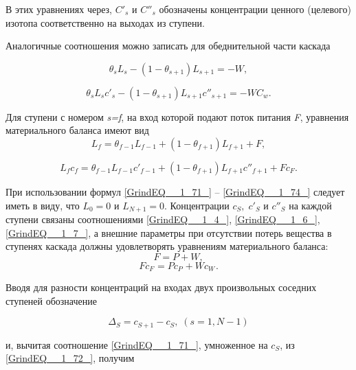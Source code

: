 В этих уравнениях через, $C'_{s}$ и $C''_{s}$ обозначены концентрации ценного (целевого) изотопа соответственно на выходах из ступени.

Аналогичные соотношения можно записать для обеднительной части каскада

\begin{equation} \label{GrindEQ__1_73_} 
  \theta _{s} L_{s} -(1-\theta _{s+1} )L_{s+1} =-W, 
\end{equation}

\begin{equation} \label{GrindEQ__1_74_} 
  \theta _{s} L_{s} c'_{s} -(1-\theta _{s+1})L_{s+1} c''_{s+1} =-WC_{w}. 
\end{equation} 

Для ступени с номером \textit{s=f}, на вход которой подают поток питания \textit{F}, уравнения материального баланса имеют вид
\begin{equation} \label{GrindEQ__1_75_} 
L_{f} =\theta _{f-1} L_{f-1} +(1-\theta _{f+1} )L_{f+1} +F,     
\end{equation}

\begin{equation} \label{GrindEQ__1_76_}
  L_{f} c_{f} = \theta _{f-1} L_{f-1} c'_{f-1} + (1-\theta _{f+1})L_{f+1} c''_{f+1} +Fc_{F}.  
\end{equation}

При использовании формул \ref{GrindEQ__1_71_} -- \ref{GrindEQ__1_74_} следует иметь в виду, что $L_{0} =0$ и $L_{N+1} =0$. Концентрации $c_{S} ,\; c'_{S} $ и $c''_{S} $ на каждой ступени связаны соотношениями \ref{GrindEQ__1_4_}, \ref{GrindEQ__1_6_}, \ref{GrindEQ__1_7_}, а внешние параметры при отсутствии потерь вещества в ступенях каскада должны удовлетворять уравнениям материального баланса:
\begin{equation} \label{GrindEQ__1_77_} 
F=P+W,                                       
\end{equation} 
\begin{equation} \label{GrindEQ__1_78_} 
Fc_{F} {}^{} =Pc_{P} {}^{} +Wc_{W} {}^{} .                      
\end{equation} 

Вводя для разности концентраций на входах двух произвольных соседних  ступеней обозначение

\begin{equation} \label{GrindEQ__1_79_} 
\Delta _{S} =c_{S+1} -c_{S} ,\; (s=1,N-1) 
\end{equation} 

и, вычитая соотношение \ref{GrindEQ__1_71_}, умноженное на $c_{S} $, из \ref{GrindEQ__1_72_}, получим

